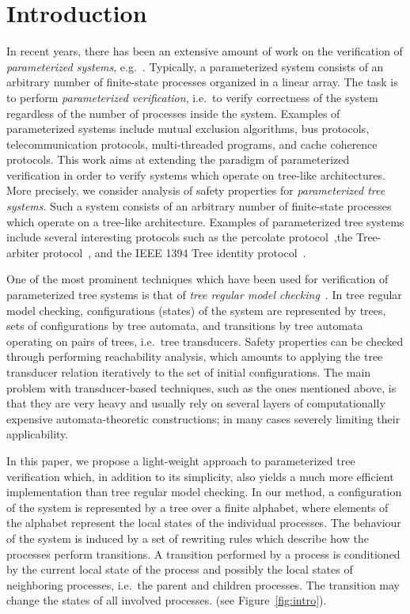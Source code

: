 \section{Introduction}
\label{sec:intro}
In recent years, there has been an extensive amount of work
on the verification of \emph{parameterized systems},
e.g.~\cite{BJNT:rmc,KMMPS2001,AJNO:simple,BLW03,BHV04}.
%
Typically, a parameterized system consists of an arbitrary number
of finite-state processes organized in a linear array.
%
The task is to perform \emph{parameterized verification}, i.e.\
to verify correctness of the system regardless
of the number of processes inside the system.
%
Examples of parameterized systems include 
mutual exclusion algorithms, bus protocols, 
telecommunication protocols, multi-threaded programs, and cache coherence
protocols.
% 
This work aims at extending the paradigm of parameterized verification
in order to verify systems which operate on tree-like architectures.
%
More precisely, we consider analysis of safety properties for
\emph{parameterized tree systems}.
%
Such a system consists of an arbitrary number
of finite-state processes which operate on a tree-like architecture.
%
%
Examples of parameterized tree systems include 
several interesting  protocols such as the percolate
protocol~\cite{KMMPS2001},the Tree-arbiter protocol~\cite{ABHQR:BDD:POM}, 
and the IEEE 1394 Tree identity protocol~\cite{ieee:1394}.
% 

One of the most prominent techniques which have been used
for verification of parameterized tree systems is that of \emph{tree regular model 
checking}~\cite{DLS01,ABMO:tree,KMMPS2001,BT02,rmc:tree:simulation:journal}. 
%
In tree regular model checking, configurations (states) of the system are represented
by trees, sets of configurations by tree automata, and transitions by tree
automata operating on pairs of trees, i.e.\ tree transducers. 
%
Safety properties can be checked through performing
reachability analysis, which amounts to applying
the tree transducer relation iteratively to the set of initial configurations.
%
The main problem with transducer-based techniques, such as the ones mentioned above, is that they
are very heavy and usually rely on several layers of computationally
expensive automata-theoretic constructions; in many cases
severely limiting their applicability.
%

In this paper, we propose a light-weight approach to parameterized tree verification
which, in addition to its simplicity, also yields a much more efficient implementation
than tree regular model checking.
%
In our method, a configuration of the system is represented by a tree over 
a finite alphabet, where elements of the alphabet represent the local states of 
the individual processes.
%
The behaviour of the system is induced by a set of
rewriting rules which describe how the processes perform transitions.
%
A transition performed by a process is
conditioned by the current local state of the process and 
possibly the local states of neighboring  processes, i.e.\ the parent and children processes.
%
The  transition may change the states of all involved processes. (see Figure~\ref{fig:intro}).
%

